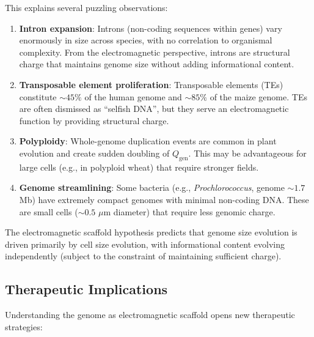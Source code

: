 \documentclass[twocolumn,10pt,aps,prd,superscriptaddress,floatfix,nofootinbib]{revtex4-2}
\theoremstyle{remark}
\begin{document}
This explains several puzzling observations:

\begin{enumerate}
\item \textbf{Intron expansion}: Introns (non-coding sequences within genes) vary enormously in size across species, with no correlation to organismal complexity. From the electromagnetic perspective, introns are structural charge that maintains genome size without adding informational content.

\item \textbf{Transposable element proliferation}: Transposable elements (TEs) constitute $\sim 45\%$ of the human genome and $\sim 85\%$ of the maize genome. TEs are often dismissed as ``selfish DNA'', but they serve an electromagnetic function by providing structural charge.

\item \textbf{Polyploidy}: Whole-genome duplication events are common in plant evolution and create sudden doubling of $Q_{\mathrm{gen}}$. This may be advantageous for large cells (e.g., in polyploid wheat) that require stronger fields.

\item \textbf{Genome streamlining}: Some bacteria (e.g., \textit{Prochlorococcus}, genome $\sim 1.7$ Mb) have extremely compact genomes with minimal non-coding DNA. These are small cells ($\sim 0.5$ $\mu$m diameter) that require less genomic charge.
\end{enumerate}

The electromagnetic scaffold hypothesis predicts that genome size evolution is driven primarily by cell size evolution, with informational content evolving independently (subject to the constraint of maintaining sufficient charge).

\subsection{Therapeutic Implications}

Understanding the genome as electromagnetic scaffold opens new therapeutic strategies:
\end{document}
